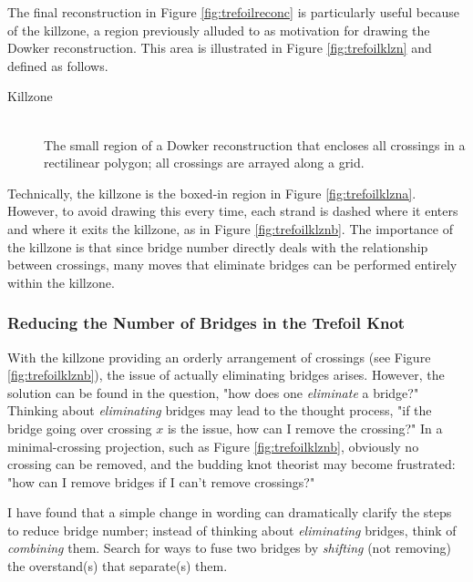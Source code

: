 \documentclass[titlepage]{article}
\begin{document}
The final reconstruction in Figure \ref{fig:trefoilreconc} is particularly useful because of the killzone, a region previously alluded to as motivation for drawing the Dowker reconstruction. This area is illustrated in Figure \ref{fig:trefoilklzn} and defined as follows.\par

\begin{defi}
    \begin{description}
        \item[Killzone] \hfill \\ The small region of a Dowker reconstruction that encloses all crossings in a rectilinear polygon; all crossings are arrayed along a grid.
    \end{description}
\end{defi}

Technically, the killzone is the boxed-in region in Figure \ref{fig:trefoilklzna}. However, to avoid drawing this every time, each strand is dashed where it enters and where it exits the killzone, as in Figure \ref{fig:trefoilklznb}. The importance of the killzone is that since bridge number directly deals with the relationship between crossings, many moves that eliminate bridges can be performed entirely within the killzone.


\subsubsection{Reducing the Number of Bridges in the Trefoil Knot}\label{ss2:trefoilreduce}
With the killzone providing an orderly arrangement of crossings (see Figure \ref{fig:trefoilklznb}), the issue of actually eliminating bridges arises. However, the solution can be found in the question, "how does one \emph{eliminate} a bridge?" Thinking about \emph{eliminating} bridges may lead to the thought process, "if the bridge going over crossing $x$ is the issue, how can I remove the crossing?" In a minimal-crossing projection, such as Figure \ref{fig:trefoilklznb}, obviously no crossing can be removed, and the budding knot theorist may become frustrated: "how can I remove bridges if I can't remove crossings?"\par
I have found that a simple change in wording can dramatically clarify the steps to reduce bridge number; instead of thinking about \emph{eliminating} bridges, think of \emph{combining} them. Search for ways to fuse two bridges by \emph{shifting} (not removing) the overstand(s) that separate(s) them.\par
\end{document}
